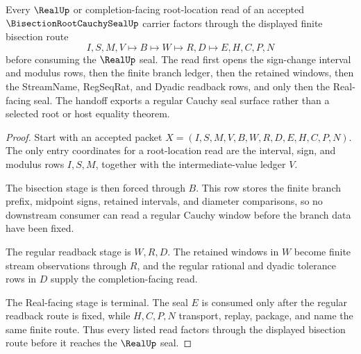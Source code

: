 \begin{theorem}
\label{thm:bisection-root-cauchy-seal-regular-handoff}
Every $\RealUp$ or completion-facing root-location read of an accepted $\BisectionRootCauchySealUp$ carrier factors through the displayed finite bisection route
$$
I,S,M,V \longmapsto B \longmapsto W \longmapsto R,D \longmapsto E,H,C,P,N
$$
before consuming the $\RealUp$ seal. The read first opens the sign-change interval and modulus rows, then the finite branch ledger, then the retained windows, then the StreamName, RegSeqRat, and Dyadic readback rows, and only then the Real-facing seal. The handoff exports a regular Cauchy seal surface rather than a selected root or host equality theorem.
\end{theorem}
\begin{proof}
Start with an accepted packet $X=(I,S,M,V,B,W,R,D,E,H,C,P,N)$. The only entry coordinates for a root-location read are the interval, sign, and modulus rows $I,S,M$, together with the intermediate-value ledger $V$.

The bisection stage is then forced through $B$. This row stores the finite branch prefix, midpoint signs, retained intervals, and diameter comparisons, so no downstream consumer can read a regular Cauchy window before the branch data have been fixed.

The regular readback stage is $W,R,D$. The retained windows in $W$ become finite stream observations through $R$, and the regular rational and dyadic tolerance rows in $D$ supply the completion-facing read.

The Real-facing stage is terminal. The seal $E$ is consumed only after the regular readback route is fixed, while $H,C,P,N$ transport, replay, package, and name the same finite route. Thus every listed read factors through the displayed bisection route before it reaches the $\RealUp$ seal.
\end{proof}


